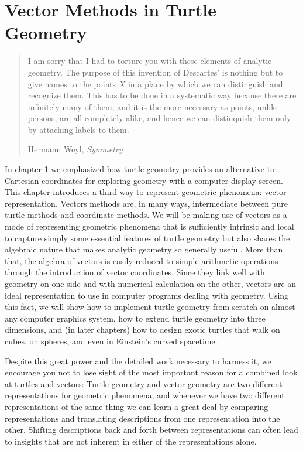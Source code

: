 \documentclass{book}
\begin{document}
\chapter{Vector Methods in Turtle Geometry}
\begin{quote}
I am sorry that I had to torture you with these
elements of analytic geometry. The purpose of this
invention of Descartes' is nothing but to give names
to the points $X$ in a plane by which we can distinguish and recognize them. This has to be done in a
systematic way because there are infinitely many of
them; and it is the more necessary as points, unlike
persons, are all completely alike, and hence we can
distinquish them only by attaching labels to them.

Hermann Weyl, {\em Symmetry}
\end{quote}

In chapter 1 we emphasized how turtle geometry provides an alternative to Cartesian coordinates for exploring geometry with a computer display screen. This chapter introduces a third way to represent
geometric phenomena: vector representation. Vectors methods are, in
many ways, intermediate between pure turtle methods and coordinate
methods. We will be making use of vectors as a mode of representing
geometric phenomena that is sufficiently intrinsic and local to capture
simply some essential features of turtle geometry but also shares the algebraic nature that makes analytic geometry so generally useful. More
than that, the algebra of vectors is easily reduced to simple arithmetic
operations through the introduction of vector coordinates. Since they
link well with geometry on one side and with numerical calculation on the
other, vectors are an ideal representation to use in computer programs
dealing with geometry. Using this fact, we will show how to implement
turtle geometry from scratch on almost any computer graphics system,
how to extend turtle geometry into three dimensions, and (in later chapters) how to design exotic turtles that walk on cubes, on spheres, and
even in Einstein's curved spacetime.

Despite this great power and the detailed work necessary to harness
it, we encourage you not to lose sight of the most important reason
for a combined look at turtles and vectors: Turtle geometry and vector
geometry are two different representations for geometric phenomena,
and whenever we have two different representations of the same thing
we can learn a great deal by comparing representations and translating
descriptions from one representation into the other. Shifting descriptions
back and forth between representations can often lead to insights that
are not inherent in either of the representations alone.
\end{document}
